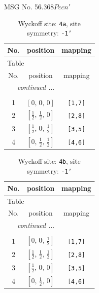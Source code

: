 \documentclass[fleqn,8pt]{jsarticle}
\begin{document}
\setcounter{MaxMatrixCols}{32}

\renewcommand{\tablename}{Table~}
\renewcommand{\figurename}{Figure~}
\begin{center}
\LARGE
MSG No. 56.368\quad$Pccn'$
\end{center}
\renewcommand{\arraystretch}{1.2}
\begin{longtable}{ccc}
\caption{Wyckoff site: {\tt 4a}, site symmetry: {\tt -1'}}
 \\
 \hline \hline
No. & position & mapping \\ \hline \endfirsthead

\multicolumn{2}{l}{\tablename\ \thetable{}} \\
 \hline \hline
No. & position & mapping \\ \hline \endhead

 \hline \hline
\multicolumn{2}{r}{\footnotesize\it continued ...} \\ \endfoot

 \hline \hline
\multicolumn{2}{r}{} \\ \endlastfoot

1 & $\left[ 0,\, 0,\, 0 \right]$ & {\tt [1,7]} \\ \hline
2 & $\left[ \frac{1}{2},\, \frac{1}{2},\, 0 \right]$ & {\tt [2,8]} \\ \hline
3 & $\left[ \frac{1}{2},\, 0,\, \frac{1}{2} \right]$ & {\tt [3,5]} \\ \hline
4 & $\left[ 0,\, \frac{1}{2},\, \frac{1}{2} \right]$ & {\tt [4,6]} \\
\end{longtable}
\renewcommand{\arraystretch}{1.2}
\begin{longtable}{ccc}
\caption{Wyckoff site: {\tt 4b}, site symmetry: {\tt -1'}}
 \\
 \hline \hline
No. & position & mapping \\ \hline \endfirsthead

\multicolumn{2}{l}{\tablename\ \thetable{}} \\
 \hline \hline
No. & position & mapping \\ \hline \endhead

 \hline \hline
\multicolumn{2}{r}{\footnotesize\it continued ...} \\ \endfoot

 \hline \hline
\multicolumn{2}{r}{} \\ \endlastfoot

1 & $\left[ 0,\, 0,\, \frac{1}{2} \right]$ & {\tt [1,7]} \\ \hline
2 & $\left[ \frac{1}{2},\, \frac{1}{2},\, \frac{1}{2} \right]$ & {\tt [2,8]} \\ \hline
3 & $\left[ \frac{1}{2},\, 0,\, 0 \right]$ & {\tt [3,5]} \\ \hline
4 & $\left[ 0,\, \frac{1}{2},\, 0 \right]$ & {\tt [4,6]} \\
\end{longtable}
\end{document}
